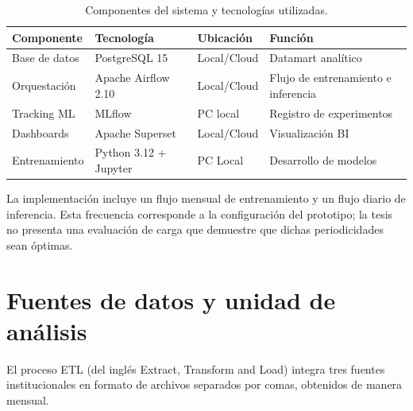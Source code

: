 \begin{table}[H]
    \centering
    \begin{tabular}{
        | >{\raggedright\arraybackslash}p{3.0cm}
        | >{\raggedright\arraybackslash}p{4.5cm}
        | >{\raggedright\arraybackslash}p{2.5cm}        
        | >{\raggedright\arraybackslash}p{4.5cm} |
    }
        \hline
            \textbf{Componente} & \textbf{Tecnología} & \textbf{Ubicación} & \textbf{Función} \\
        \hline
            Base de datos & PostgreSQL 15 \cite{postgresql2024documentation} & Local/Cloud & Datamart analítico \\
        \hline
            Orquestación & Apache Airflow 2.10 \cite{apache2024airflow} & Local/Cloud & Flujo de entrenamiento e inferencia \\
        \hline
            Tracking ML & MLflow \cite{mlflow2024documentation} & PC local & Registro de experimentos \\
        \hline
            Dashboards & Apache Superset \cite{apache2024superset} & Local/Cloud & Visualización BI \\
        \hline
            Entrenamiento & Python 3.12 + Jupyter & PC Local & Desarrollo de modelos \\
        \hline
    \end{tabular}
    \caption{Componentes del sistema y tecnologías utilizadas.}
    \label{tab:componentes}
\end{table}

La implementación incluye un flujo mensual de entrenamiento y un flujo diario de inferencia. Esta frecuencia corresponde a la configuración del prototipo; la tesis no presenta una evaluación de carga que demuestre que dichas periodicidades sean óptimas.

\section{Fuentes de datos y unidad de análisis}

El proceso ETL (del inglés Extract, Transform and Load) integra tres fuentes institucionales en formato de archivos separados por comas, obtenidos de manera mensual.

